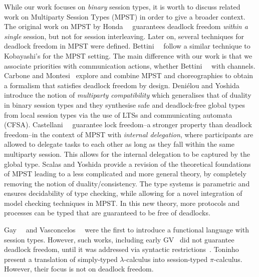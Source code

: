 \documentclass[main.tex]{subfiles}
\begin{document}
While our work focuses on \emph{binary} session types, it is worth to discuss related work on Multiparty Session Types (MPST) in order to give a broader context. The original work on MPST by Honda~\etal~\cite{hondayoshida08} guarantees deadlock freedom \emph{within a single} session, but not for session interleaving.
Later on, several techniques for deadlock freedom in MPST were defined.
Bettini~\etal~\cite{bettinicoppo08} follow a similar technique to Kobayashi's for the MPST setting. The main difference with our work is that we associate priorities with communication actions, whether Bettini~\etal~\cite{bettinicoppo08} with channels. Carbone and Montesi~\cite{carbonemontesi13} explore and combine MPST and choreographies to obtain a formalism that satisfies deadlock freedom by design.
Deni{\'{e}}lou and Yoshida \cite{DenielouY13} introduce the notion of \emph{multiparty compatibility} which generalises that of duality in binary session types and they synthesise safe and deadlock-free global types from local session types via the use of LTSs and communicating automata (CFSA).
Castellani~\etal~\cite{CastellaniDGH20} guarantee lock freedom--a stronger property than deadlock freedom--in the context of MPST with \emph{internal delegation}, where participants are allowed to delegate tasks to each other as long as they fall within the same multiparty session. This allows for the internal delegation to be captured by the global type.
Scalas and Yoshida \cite{scalasyoshida19} provide a revision of the theoretical foundations of MPST leading to a less complicated and more general theory, by completely removing the notion of duality/consistency. The type systems is parametric and ensures decidability of type checking, while allowing for a novel integration of model checking techniques in MPST. In this new theory, more protocols and processes can be typed that are guaranteed to be free of deadlocks. 

Gay~\etal~\cite{gaynagarajan03} and Vasconcelos~\etal~\cite{vasconcelosravara04,vasconcelosgay06} were the first to introduce a functional language with session types. However, such works, including early GV~\cite{gayvasconcelos10,gayvasconcelos12} did not guarantee deadlock freedom, until it was addressed via syntactic restrictions~\cite{lindleymorris15,wadler14}. Toninho~\etal~\cite{toninhocaires12} present a translation of simply-typed $\lambda$-calculus into session-typed $\pi$-calculus. However, their focus is not on deadlock freedom.
\end{document}
